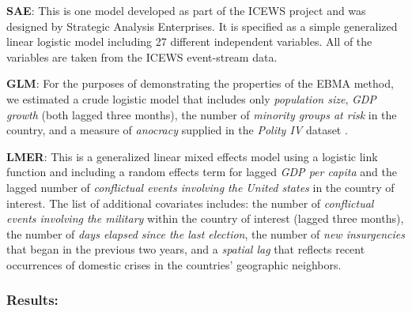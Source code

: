 \begin{list}{}{\leftmargin=1em}
\item \textbf{SAE}: This is one model developed as part of the ICEWS
  project and was designed by Strategic Analysis Enterprises. It is
  specified as a simple generalized linear logistic model including 27
  different independent variables.  All of the variables are taken from the ICEWS
  event-stream data.
\item \textbf{GLM}: For the purposes of demonstrating the properties
  of the EBMA method, we estimated a crude logistic model that
  includes only \textit{population size}, \textit{GDP growth} (both
  lagged three months), the number of \textit{minority groups at risk} in the country,
  and a measure of \textit{anocracy} supplied in the \textit{Polity IV} dataset
  \citep{PolityIV}.
\item \textbf{LMER}: This is a generalized linear mixed effects model
  using a logistic link function and including a random effects term
  for lagged \textit{GDP per capita} and the lagged number of
  \textit{conflictual events involving the United states} in the
  country of interest. The list of additional covariates includes: the
  number of \textit{conflictual events involving the military} within
  the country of interest (lagged three months), the number of
  \textit{days elapsed since the last election}, the number of \textit{new insurgencies} that
  began in the previous two years, and a \textit{spatial lag} that
  reflects recent occurrences of domestic crises in the countries'
  geographic neighbors.
\end{list}


\subsubsection{Results:}



